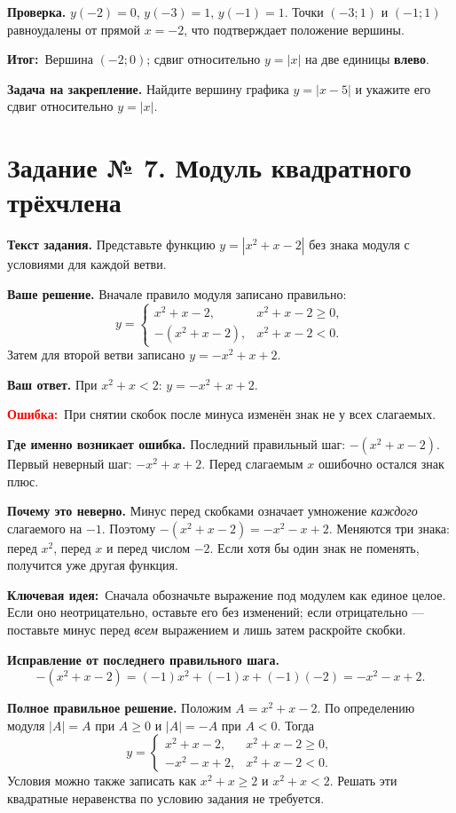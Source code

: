 \documentclass[12pt,a4paper]{article}
\newcommand{\err}{\textcolor{red}{\textbf{Ошибка:}}}
\newcommand{\idea}{\textcolor{blue!60!black}{\textbf{Ключевая идея:}}}
\newcommand{\outcome}{\textcolor{teal!60!black}{\textbf{Итог:}}}
\begin{document}
\textbf{Проверка.} $y(-2)=0$, $y(-3)=1$, $y(-1)=1$. Точки $(-3;1)$ и $(-1;1)$ равноудалены от прямой $x=-2$, что подтверждает положение вершины.

\outcome\ Вершина $(-2;0)$; сдвиг относительно $y=|x|$ на две единицы \textbf{влево}.

\textbf{Задача на закрепление.} Найдите вершину графика $y=|x-5|$ и укажите его сдвиг относительно $y=|x|$.

\clearpage
{}\label{task:7}
\section*{Задание № 7. Модуль квадратного трёхчлена}
\textbf{Текст задания.} Представьте функцию $y=|x^2+x-2|$ без знака модуля с условиями для каждой ветви.

\textbf{Ваше решение.} Вначале правило модуля записано правильно:
\[
y=\begin{cases}x^2+x-2,&x^2+x-2\geqslant0,\\-(x^2+x-2),&x^2+x-2<0.\end{cases}
\]
Затем для второй ветви записано $y=-x^2+x+2$.

\textbf{Ваш ответ.} При $x^2+x<2$: $y=-x^2+x+2$.

\err\ При снятии скобок после минуса изменён знак не у всех слагаемых.

\textbf{Где именно возникает ошибка.} Последний правильный шаг: $-(x^2+x-2)$. Первый неверный шаг: $-x^2+x+2$. Перед слагаемым $x$ ошибочно остался знак плюс.

\textbf{Почему это неверно.} Минус перед скобками означает умножение \emph{каждого} слагаемого на $-1$. Поэтому $-(x^2+x-2)=-x^2-x+2$. Меняются три знака: перед $x^2$, перед $x$ и перед числом $-2$. Если хотя бы один знак не поменять, получится уже другая функция.

\idea\ Сначала обозначьте выражение под модулем как единое целое. Если оно неотрицательно, оставьте его без изменений; если отрицательно --- поставьте минус перед \emph{всем} выражением и лишь затем раскройте скобки.

\textbf{Исправление от последнего правильного шага.}
\[
-(x^2+x-2)=(-1)x^2+(-1)x+(-1)(-2)=-x^2-x+2.
\]

\textbf{Полное правильное решение.} Положим $A=x^2+x-2$. По определению модуля $|A|=A$ при $A\geqslant0$ и $|A|=-A$ при $A<0$. Тогда
\[
y=\begin{cases}
x^2+x-2,&x^2+x-2\geqslant0,\\
-x^2-x+2,&x^2+x-2<0.
\end{cases}
\]
Условия можно также записать как $x^2+x\geqslant2$ и $x^2+x<2$. Решать эти квадратные неравенства по условию задания не требуется.
\end{document}
